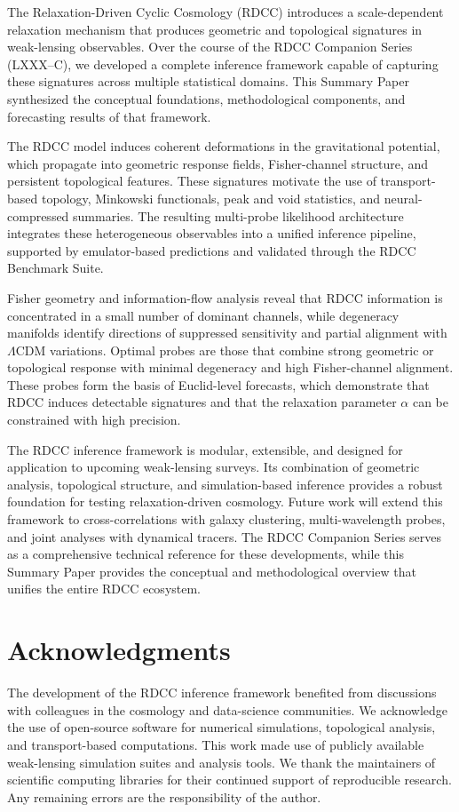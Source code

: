 \documentclass[11pt,a4paper]{article}
\begin{document}
The Relaxation-Driven Cyclic Cosmology (RDCC) introduces a scale-dependent 
relaxation mechanism that produces geometric and topological signatures in 
weak-lensing observables. Over the course of the RDCC Companion Series 
(LXXX--C), we developed a complete inference framework capable of capturing 
these signatures across multiple statistical domains. This Summary Paper 
synthesized the conceptual foundations, methodological components, and 
forecasting results of that framework.

The RDCC model induces coherent deformations in the gravitational potential, 
which propagate into geometric response fields, Fisher-channel structure, and 
persistent topological features. These signatures motivate the use of 
transport-based topology, Minkowski functionals, peak and void statistics, and 
neural-compressed summaries. The resulting multi-probe likelihood architecture 
integrates these heterogeneous observables into a unified inference pipeline, 
supported by emulator-based predictions and validated through the RDCC Benchmark 
Suite.

Fisher geometry and information-flow analysis reveal that RDCC information is 
concentrated in a small number of dominant channels, while degeneracy manifolds 
identify directions of suppressed sensitivity and partial alignment with 
$\Lambda$CDM variations. Optimal probes are those that combine strong geometric 
or topological response with minimal degeneracy and high Fisher-channel 
alignment. These probes form the basis of Euclid-level forecasts, which 
demonstrate that RDCC induces detectable signatures and that the relaxation 
parameter $\alpha$ can be constrained with high precision.

The RDCC inference framework is modular, extensible, and designed for 
application to upcoming weak-lensing surveys. Its combination of geometric 
analysis, topological structure, and simulation-based inference provides a 
robust foundation for testing relaxation-driven cosmology. Future work will 
extend this framework to cross-correlations with galaxy clustering, 
multi-wavelength probes, and joint analyses with dynamical tracers. The RDCC 
Companion Series serves as a comprehensive technical reference for these 
developments, while this Summary Paper provides the conceptual and methodological 
overview that unifies the entire RDCC ecosystem.
\section*{Acknowledgments}

The development of the RDCC inference framework benefited from discussions with 
colleagues in the cosmology and data-science communities. We acknowledge the 
use of open-source software for numerical simulations, topological analysis, 
and transport-based computations. This work made use of publicly available 
weak-lensing simulation suites and analysis tools. We thank the maintainers of 
scientific computing libraries for their continued support of reproducible 
research. Any remaining errors are the responsibility of the author.


\nocite{*}

\end{document}
